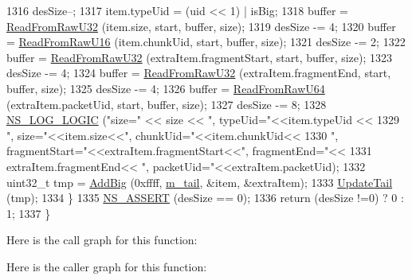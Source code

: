 \begin{DoxyCode}
1316       desSize--;
1317       item.typeUid = (uid << 1) | isBig;
1318       buffer = \hyperlink{classns3_1_1PacketMetadata_a5a055957d2f52aeee983871a358215a7}{ReadFromRawU32} (item.size, start, buffer, size);
1319       desSize -= 4;
1320       buffer = \hyperlink{classns3_1_1PacketMetadata_a9466105641875317279a17991707e308}{ReadFromRawU16} (item.chunkUid, start, buffer, size);
1321       desSize -= 2;
1322       buffer = \hyperlink{classns3_1_1PacketMetadata_a5a055957d2f52aeee983871a358215a7}{ReadFromRawU32} (extraItem.fragmentStart, start, buffer, size);
1323       desSize -= 4;
1324       buffer = \hyperlink{classns3_1_1PacketMetadata_a5a055957d2f52aeee983871a358215a7}{ReadFromRawU32} (extraItem.fragmentEnd, start, buffer, size);
1325       desSize -= 4;
1326       buffer = \hyperlink{classns3_1_1PacketMetadata_a069d077359e7d6dac6b575b12584a7ae}{ReadFromRawU64} (extraItem.packetUid, start, buffer, size);
1327       desSize -= 8;
1328       \hyperlink{group__logging_ga88acd260151caf2db9c0fc84997f45ce}{NS\_LOG\_LOGIC} (\textcolor{stringliteral}{"size="} << size << \textcolor{stringliteral}{", typeUid="}<<item.typeUid <<
1329                     \textcolor{stringliteral}{", size="}<<item.size<<\textcolor{stringliteral}{", chunkUid="}<<item.chunkUid<<
1330                     \textcolor{stringliteral}{", fragmentStart="}<<extraItem.fragmentStart<<\textcolor{stringliteral}{", fragmentEnd="}<<
1331                     extraItem.fragmentEnd<< \textcolor{stringliteral}{", packetUid="}<<extraItem.packetUid);
1332       uint32\_t tmp = \hyperlink{classns3_1_1PacketMetadata_ae89a0bf5e3dcd624bd37bc8ca67544da}{AddBig} (0xffff, \hyperlink{classns3_1_1PacketMetadata_ad24a659e236af7b98c475c97c4f60db9}{m\_tail}, &item, &extraItem);
1333       \hyperlink{classns3_1_1PacketMetadata_ad975bb9c1c0a6875ccc2309f071c5b55}{UpdateTail} (tmp);
1334     \}
1335   \hyperlink{assert_8h_a6dccdb0de9b252f60088ce281c49d052}{NS\_ASSERT} (desSize == 0);
1336   \textcolor{keywordflow}{return} (desSize !=0) ? 0 : 1;
1337 \}
\end{DoxyCode}


Here is the call graph for this function\+:




Here is the caller graph for this function\+:


